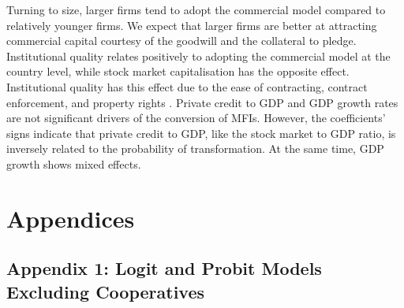 \documentclass[a4paper, nobind]{templates/ociamthesis}
\begin{document}
Turning to size, larger firms tend to adopt the commercial model compared to relatively younger firms. We expect that larger firms are better at attracting commercial capital courtesy of the goodwill and the collateral to pledge. Institutional quality relates positively to adopting the commercial model at the country level, while stock market capitalisation has the opposite effect. Institutional quality has this effect due to the ease of contracting, contract enforcement, and property rights \autocite{claessens2003financial}. Private credit to GDP and GDP growth rates are not significant drivers of the conversion of MFIs. However, the coefficients' signs indicate that private credit to GDP, like the stock market to GDP ratio, is inversely related to the probability of transformation. At the same time, GDP growth shows mixed effects.

\hypertarget{appendices}{%
\section{Appendices}\label{appendices}}

\hypertarget{appendix-1-logit-and-probit-models-excluding-cooperatives}{%
\subsection{Appendix 1: Logit and Probit Models Excluding Cooperatives}\label{appendix-1-logit-and-probit-models-excluding-cooperatives}}
\end{document}
